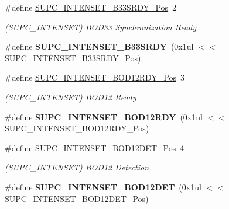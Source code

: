 \begin{DoxyCompactItemize}
\item 
\hypertarget{group___s_a_m_l21___s_u_p_c_gaab709d13b11235927bc34d9b00ad23b9}{}\#define \hyperlink{group___s_a_m_l21___s_u_p_c_gaab709d13b11235927bc34d9b00ad23b9}{S\+U\+P\+C\+\_\+\+I\+N\+T\+E\+N\+S\+E\+T\+\_\+\+B33\+S\+R\+D\+Y\+\_\+\+Pos}~2\label{group___s_a_m_l21___s_u_p_c_gaab709d13b11235927bc34d9b00ad23b9}

\begin{DoxyCompactList}\small\item\em (S\+U\+P\+C\+\_\+\+I\+N\+T\+E\+N\+S\+E\+T) B\+O\+D33 Synchronization Ready \end{DoxyCompactList}\item 
\hypertarget{group___s_a_m_l21___s_u_p_c_ga4cba093130f6444af129216443472c8e}{}\#define {\bfseries S\+U\+P\+C\+\_\+\+I\+N\+T\+E\+N\+S\+E\+T\+\_\+\+B33\+S\+R\+D\+Y}~(0x1ul $<$$<$ S\+U\+P\+C\+\_\+\+I\+N\+T\+E\+N\+S\+E\+T\+\_\+\+B33\+S\+R\+D\+Y\+\_\+\+Pos)\label{group___s_a_m_l21___s_u_p_c_ga4cba093130f6444af129216443472c8e}

\item 
\hypertarget{group___s_a_m_l21___s_u_p_c_gaf282bd37f283653a81fd69cb8a7146c1}{}\#define \hyperlink{group___s_a_m_l21___s_u_p_c_gaf282bd37f283653a81fd69cb8a7146c1}{S\+U\+P\+C\+\_\+\+I\+N\+T\+E\+N\+S\+E\+T\+\_\+\+B\+O\+D12\+R\+D\+Y\+\_\+\+Pos}~3\label{group___s_a_m_l21___s_u_p_c_gaf282bd37f283653a81fd69cb8a7146c1}

\begin{DoxyCompactList}\small\item\em (S\+U\+P\+C\+\_\+\+I\+N\+T\+E\+N\+S\+E\+T) B\+O\+D12 Ready \end{DoxyCompactList}\item 
\hypertarget{group___s_a_m_l21___s_u_p_c_ga8bee1966e7c8582fa0322bca4935079d}{}\#define {\bfseries S\+U\+P\+C\+\_\+\+I\+N\+T\+E\+N\+S\+E\+T\+\_\+\+B\+O\+D12\+R\+D\+Y}~(0x1ul $<$$<$ S\+U\+P\+C\+\_\+\+I\+N\+T\+E\+N\+S\+E\+T\+\_\+\+B\+O\+D12\+R\+D\+Y\+\_\+\+Pos)\label{group___s_a_m_l21___s_u_p_c_ga8bee1966e7c8582fa0322bca4935079d}

\item 
\hypertarget{group___s_a_m_l21___s_u_p_c_ga3af0c55be8862fb88a04d01ca916fd91}{}\#define \hyperlink{group___s_a_m_l21___s_u_p_c_ga3af0c55be8862fb88a04d01ca916fd91}{S\+U\+P\+C\+\_\+\+I\+N\+T\+E\+N\+S\+E\+T\+\_\+\+B\+O\+D12\+D\+E\+T\+\_\+\+Pos}~4\label{group___s_a_m_l21___s_u_p_c_ga3af0c55be8862fb88a04d01ca916fd91}

\begin{DoxyCompactList}\small\item\em (S\+U\+P\+C\+\_\+\+I\+N\+T\+E\+N\+S\+E\+T) B\+O\+D12 Detection \end{DoxyCompactList}\item 
\hypertarget{group___s_a_m_l21___s_u_p_c_gaacb59e5af4641fef54f7fea676af0409}{}\#define {\bfseries S\+U\+P\+C\+\_\+\+I\+N\+T\+E\+N\+S\+E\+T\+\_\+\+B\+O\+D12\+D\+E\+T}~(0x1ul $<$$<$ S\+U\+P\+C\+\_\+\+I\+N\+T\+E\+N\+S\+E\+T\+\_\+\+B\+O\+D12\+D\+E\+T\+\_\+\+Pos)\label{group___s_a_m_l21___s_u_p_c_gaacb59e5af4641fef54f7fea676af0409}


\end{DoxyCompactItemize}
